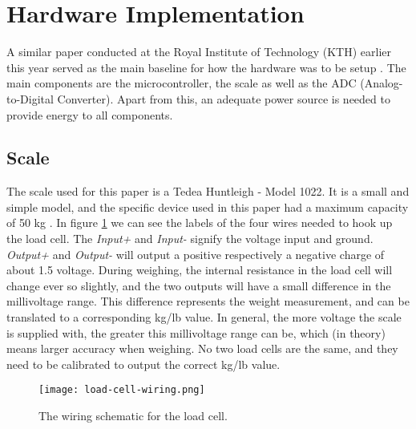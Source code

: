 




\section{Hardware Implementation}

A similar paper conducted at the Royal Institute of Technology (KTH) earlier this year served as the main baseline for how the hardware was to be setup \cite{hospital}. The main components are the microcontroller, the scale as well as the ADC (Analog-to-Digital Converter). Apart from this, an adequate power source is needed to provide energy to all components. 

\subsection{Scale}
The scale used for this paper is a Tedea Huntleigh - Model 1022. It is a small and simple model, and the specific device used in this paper had a maximum capacity of 50 kg \cite{load-cell-data}. In figure \ref{fig:load_cell_wiring} we can see the labels of the four wires needed to hook up the load cell. The \textit{Input+} and \textit{Input-} signify the voltage input and ground. \cite{load-cell-spec} \textit{Output+} and \textit{Output-} will output a positive respectively a negative charge of about 1.5 voltage. During weighing, the internal resistance in the load cell will change ever so slightly, and the two outputs will have a small difference in the millivoltage range. This difference represents the weight measurement, and can be translated to a corresponding kg/lb value. In general, the more voltage the scale is supplied with, the greater this millivoltage range can be, which (in theory) means larger accuracy when weighing. No two load cells are the same, and they need to be calibrated to output the correct kg/lb value.

\begin{figure}[h]
	\centering
	\texttt{[image: load-cell-wiring.png]}
	\caption{The wiring schematic for the load cell.}
	\label{fig:load_cell_wiring}
\end{figure}


